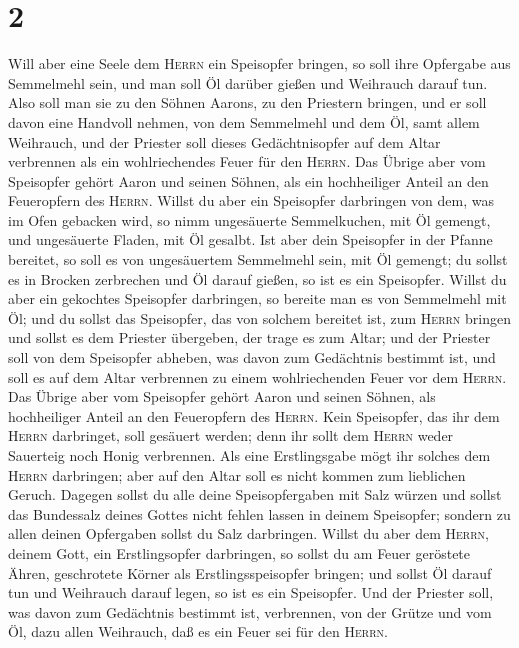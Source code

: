\hypertarget{section-1}{%
\section{2}\label{section-1}}

 Will aber eine Seele dem \textsc{Herrn} ein Speisopfer
bringen, so soll ihre Opfergabe aus Semmelmehl sein, und man soll Öl
darüber gießen und Weihrauch darauf tun.  Also soll man
sie zu den Söhnen Aarons, zu den Priestern bringen, und er soll davon
eine Handvoll nehmen, von dem Semmelmehl und dem Öl, samt allem
Weihrauch, und der Priester soll dieses Gedächtnisopfer auf dem Altar
verbrennen als ein wohlriechendes Feuer für den \textsc{Herrn}.
 Das Übrige aber vom Speisopfer gehört Aaron und seinen
Söhnen, als ein hochheiliger Anteil an den Feueropfern des
\textsc{Herrn}.  Willst du aber ein Speisopfer darbringen
von dem, was im Ofen gebacken wird, so nimm ungesäuerte Semmelkuchen,
mit Öl gemengt, und ungesäuerte Fladen, mit Öl gesalbt. 
Ist aber dein Speisopfer in der Pfanne bereitet, so soll es von
ungesäuertem Semmelmehl sein, mit Öl gemengt;  du sollst
es in Brocken zerbrechen und Öl darauf gießen, so ist es ein Speisopfer.
 Willst du aber ein gekochtes Speisopfer darbringen, so
bereite man es von Semmelmehl mit Öl;  und du sollst das
Speisopfer, das von solchem bereitet ist, zum \textsc{Herrn} bringen und
sollst es dem Priester übergeben, der trage es zum Altar; 
und der Priester soll von dem Speisopfer abheben, was davon zum
Gedächtnis bestimmt ist, und soll es auf dem Altar verbrennen zu einem
wohlriechenden Feuer vor dem \textsc{Herrn}.  Das Übrige
aber vom Speisopfer gehört Aaron und seinen Söhnen, als hochheiliger
Anteil an den Feueropfern des \textsc{Herrn}.  Kein
Speisopfer, das ihr dem \textsc{Herrn} darbringet, soll gesäuert werden;
denn ihr sollt dem \textsc{Herrn} weder Sauerteig noch Honig verbrennen.
 Als eine Erstlingsgabe mögt ihr solches dem
\textsc{Herrn} darbringen; aber auf den Altar soll es nicht kommen zum
lieblichen Geruch.  Dagegen sollst du alle deine
Speisopfergaben mit Salz würzen und sollst das Bundessalz deines Gottes
nicht fehlen lassen in deinem Speisopfer; sondern zu allen deinen
Opfergaben sollst du Salz darbringen.  Willst du aber dem
\textsc{Herrn}, deinem Gott, ein Erstlingsopfer darbringen, so sollst du
am Feuer geröstete Ähren, geschrotete Körner als Erstlingsspeisopfer
bringen;  und sollst Öl darauf tun und Weihrauch darauf
legen, so ist es ein Speisopfer.  Und der Priester soll,
was davon zum Gedächtnis bestimmt ist, verbrennen, von der Grütze und
vom Öl, dazu allen Weihrauch, daß es ein Feuer sei für den
\textsc{Herrn}.

